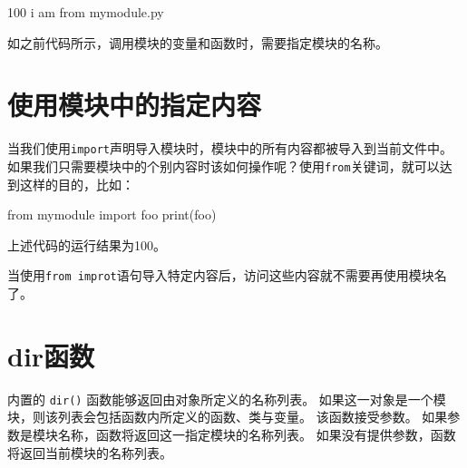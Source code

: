 \documentclass[]{ctexbook}
\newenvironment{Shaded}{\begin{snugshade}}{\end{snugshade}}
\newcommand{\BuiltInTok}[1]{#1}
\newcommand{\DecValTok}[1]{\textcolor[rgb]{0.00,0.00,0.81}{#1}}
\newcommand{\ImportTok}[1]{#1}
\newcommand{\NormalTok}[1]{#1}
\begin{document}
\begin{Shaded}
\begin{Highlighting}[]
\DecValTok{100}
\NormalTok{i am }\ImportTok{from}\NormalTok{ mymodule.py}
\end{Highlighting}
\end{Shaded}

如之前代码所示，调用模块的变量和函数时，需要指定模块的名称。

\hypertarget{ux4f7fux7528ux6a21ux5757ux4e2dux7684ux6307ux5b9aux5185ux5bb9}{%
\section{使用模块中的指定内容}\label{ux4f7fux7528ux6a21ux5757ux4e2dux7684ux6307ux5b9aux5185ux5bb9}}

当我们使用\texttt{import}声明导入模块时，模块中的所有内容都被导入到当前文件中。如果我们只需要模块中的个别内容时该如何操作呢？使用\texttt{from}关键词，就可以达到这样的目的，比如：

\begin{Shaded}
\begin{Highlighting}[]
\ImportTok{from}\NormalTok{ mymodule }\ImportTok{import}\NormalTok{ foo}
\BuiltInTok{print}\NormalTok{(foo)}
\end{Highlighting}
\end{Shaded}

上述代码的运行结果为100。

当使用\texttt{from\ improt}语句导入特定内容后，访问这些内容就不需要再使用模块名了。

\hypertarget{dirux51fdux6570}{%
\section{dir函数}\label{dirux51fdux6570}}

内置的 \texttt{dir()} 函数能够返回由对象所定义的名称列表。 如果这一对象是一个模块，则该列表会包括函数内所定义的函数、类与变量。
该函数接受参数。 如果参数是模块名称，函数将返回这一指定模块的名称列表。 如果没有提供参数，函数将返回当前模块的名称列表。
\end{document}
